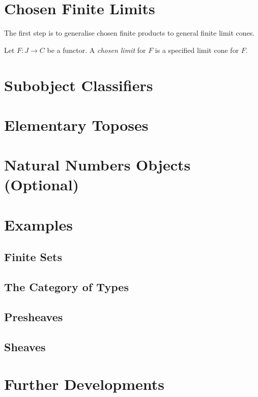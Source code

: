 \section{Chosen Finite Limits}

The first step is to generalise chosen finite products to general finite limit cones.

\begin{definition}
  \label{def:chosen_limit}
  \leanok
Let $F : J \to C$ be a functor. A \emph{chosen limit} for $F$ is a specified limit cone for $F$.
\end{definition}

\section{Subobject Classifiers}
\section{Elementary Toposes}
\section{Natural Numbers Objects (Optional)}
\section{Examples}
\subsection{Finite Sets}
\subsection{The Category of Types}
\subsection{Presheaves}
\subsection{Sheaves}
\section{Further Developments}

